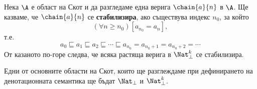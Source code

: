 Нека $\A$ е област на Скот и да разгледаме една верига $\chain{a}{n}$ в $\A$.
Ще казваме, че $\chain{a}{n}$ се {\bf стабилизира}, ако съществува индекс $n_0$, за който
\[(\forall n \geq n_0)[a_{n_0} = a_{n}],\]
т.е.
\[a_0 \sqsubseteq a_1 \sqsubseteq a_2 \sqsubseteq \cdots \sqsubseteq a_{n_0} = a_{n_0+1} = a_{n_0+2} = \cdots\]
От казаното по-горе следва, че всяка растяща верига в $\Nat^k_\bot$ се стабилизира.

\begin{remark}
  Едни от основните области на Скот, които ще разглеждаме при дефинирането на денотационната семантика
  ще бъдат $\Nat_\bot$ и $\Nat^k_\bot$.
\end{remark}


